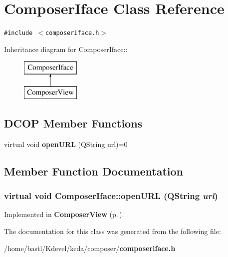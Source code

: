 \section{Composer\-Iface Class Reference}
\label{classComposerIface}
{\tt \#include $<$composeriface.h$>$}

Inheritance diagram for Composer\-Iface::\begin{figure}[H]
\begin{center}
\leavevmode
\includegraphics[height=2cm]{classComposerIface}
\end{center}
\end{figure}
\subsection*{DCOP Member Functions}
\begin{CompactItemize}
\item 
virtual void {\bf open\-URL} (QString url)=0
\end{CompactItemize}


\subsection{Member Function Documentation}
\subsubsection{\setlength{\rightskip}{0pt plus 5cm}virtual void Composer\-Iface::open\-URL (QString {\em url})\hspace{0.3cm}{\tt  [pure virtual]}}\label{classComposerIface_3deb991ea51d92a58332714d156f1389}




Implemented in {\bf Composer\-View} {\rm (p.\,\pageref{classComposerView_1d669cfc5a2d59fafee1b0c99df3a957})}.

The documentation for this class was generated from the following file:\begin{CompactItemize}
\item 
/home/bastl/Kdevel/keda/composer/{\bf composeriface.h}\end{CompactItemize}

